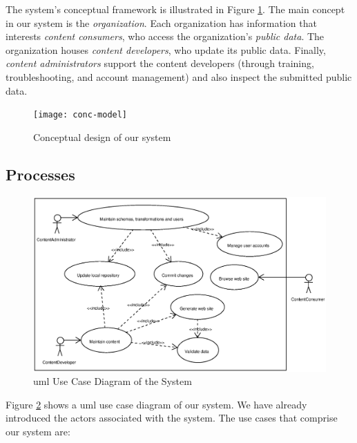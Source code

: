 \documentclass{article}
\begin{document}
The system's conceptual framework is illustrated in Figure \ref{fig:conc-model}.
The main concept in our system is the {\em organization}.
Each organization has information that interests {\em content consumers},
who access the organization's {\em public data}.
The organization houses {\em content developers},
who update its public data.
Finally, {\em content administrators} 
support the content developers
(through training, troubleshooting, and account management)
and also inspect the submitted public data.

\begin{figure}[h!]
\begin{center}
\texttt{[image: conc-model]}
\end{center}
\caption{Conceptual design of our system}
\label{fig:conc-model}
\end{figure}

\subsection{Processes}

\begin{figure}[h!]
\includegraphics[scale=0.5]{use-case-diagram}
\caption{{\sc uml} Use Case Diagram of the System}
\label{fig:use-case-diagram}
\end{figure}

Figure \ref{fig:use-case-diagram} shows a {\sc uml} \cite{UML} use case diagram of our system. 
We have already introduced the actors associated with the system.
The use cases that comprise our system are:
\end{document}

